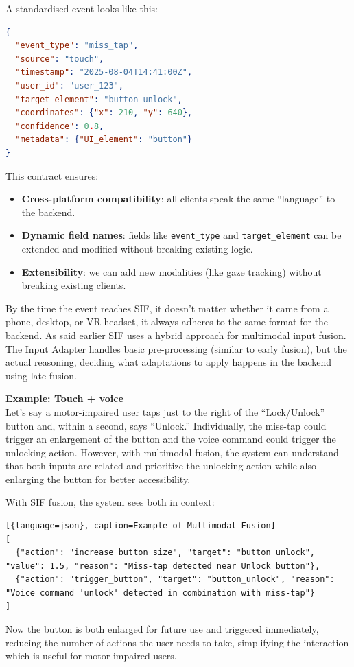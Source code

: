 \documentclass[openany]{book}
\begin{document}
A standardised event looks like this:
\begin{lstlisting}[language=json, caption={Standardised Event Example}]
{
  "event_type": "miss_tap",
  "source": "touch",
  "timestamp": "2025-08-04T14:41:00Z",
  "user_id": "user_123",
  "target_element": "button_unlock",
  "coordinates": {"x": 210, "y": 640},
  "confidence": 0.8,
  "metadata": {"UI_element": "button"}
}
\end{lstlisting}
This contract ensures:
\begin{itemize}
    \item \textbf{Cross-platform compatibility}: all clients speak the same “language” to the backend.
    \item \textbf{Dynamic field names}: fields like \texttt{event\_type} and \texttt{target\_element} can be extended and modified without breaking existing logic.
    \item \textbf{Extensibility}: we can add new modalities (like gaze tracking) without breaking existing clients.
\end{itemize}
By the time the event reaches SIF, it doesn’t matter whether it came from a phone, desktop, or VR headset, it always adheres to the same format for the backend.
As said earlier SIF uses a hybrid approach for multimodal input fusion. The Input Adapter handles basic pre-processing (similar to early fusion), but the actual reasoning, deciding what adaptations to apply happens in the backend using late fusion.

\textbf{Example: Touch + voice} \\
Let’s say a motor-impaired user taps just to the right of the “Lock/Unlock” button and, within a second, says “Unlock.”
Individually, the miss-tap could trigger an enlargement of the button and the voice command could trigger the unlocking action. However, with multimodal fusion, the system can understand that both inputs are related and prioritize the unlocking action while also enlarging the button for better accessibility.

With SIF fusion, the system sees both in context:

\begin{lstlisting}[{language=json}, caption=Example of Multimodal Fusion]
[
  {"action": "increase_button_size", "target": "button_unlock", "value": 1.5, "reason": "Miss-tap detected near Unlock button"},
  {"action": "trigger_button", "target": "button_unlock", "reason": "Voice command 'unlock' detected in combination with miss-tap"}
]
\end{lstlisting}
Now the button is both enlarged for future use and triggered immediately, reducing the number of actions the user needs to take, simplifying the interaction which is useful for motor-impaired users.
\end{document}
